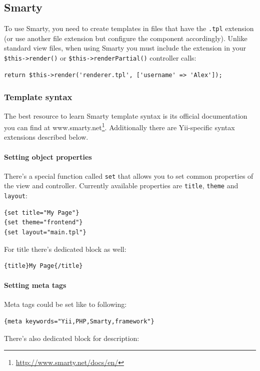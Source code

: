 \subsection{Smarty}
To use Smarty, you need to create templates in files that have the \lstinline|.tpl| extension (or use another file extension but
configure the component accordingly). Unlike standard view files, when using Smarty you must include the extension in
your \lstinline|$this->render()| or \lstinline|$this->renderPartial()| controller calls:

\lstset{language=php}\begin{lstlisting}
return $this->render('renderer.tpl', ['username' => 'Alex']);
\end{lstlisting}
\subsubsection{Template syntax}
The best resource to learn Smarty template syntax is its official documentation you can find at
www.smarty.net\footnote{\url{http://www.smarty.net/docs/en/}}. Additionally there are Yii-specific syntax extensions
described below.

\paragraph{Setting object properties}
There's a special function called \lstinline|set| that allows you to set common properties of the view and controller. Currently
available properties are \lstinline|title|, \lstinline|theme| and \lstinline|layout|:

\begin{lstlisting}
{set title="My Page"}
{set theme="frontend"}
{set layout="main.tpl"}
\end{lstlisting}
For title there's dedicated block as well:

\begin{lstlisting}
{title}My Page{/title}
\end{lstlisting}
\paragraph{Setting meta tags}
Meta tags could be set like to following:

\begin{lstlisting}
{meta keywords="Yii,PHP,Smarty,framework"}
\end{lstlisting}
There's also dedicated block for description:

